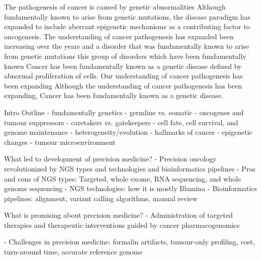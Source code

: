 The pathogenesis of cancer is caused by genetic abnormalities
Although fundamentally known to arise from genetic mutations, the disease paradigm has expanded to include aberrant epigenetic mechanisms as a contributing factor to oncogenesis.
The understanding of cancer pathogenesis has expanded been increasing over the years and a disorder that was fundamentally known to arise from genetic mutations this group of disorders which have been fundamentally known Cancer has been fundamentally known as a genetic disease defined by abnormal proliferation of cells.
Our understanding of cancer pathogenesis has been expanding  Although the understanding of cancer pathogenesis has been expanding, Cancer has been fundamentally known as a genetic disease.

Intro Outline
- fundamentally genetics
- germline vs. somatic
- oncogenes and tumour suppressors
- caretakers vs. gatekeepers
- cell fate, cell survival, and genome maintenance
- heterogeneity/evolution
- hallmarks of cancer
- epigenetic changes
- tumour microenvironment

What led to development of precision medicine?
- Precision oncology revolutionized by NGS types and technologies and bioinformatics pipelines
- Pros and cons of NGS types: Targeted, whole exome, RNA sequencing, and whole genome sequencing
- NGS technologies: how it is mostly Illumina
- Bioinformatics pipelines: alignment, variant calling algorithms, manual review

What is promising about precision medicine?
- Administration of targeted therapies and therapeutic interventions guided by cancer pharmacogenomics

- Challenges in precision medicine: formalin artifacts, tumour-only profiling, cost, turn-around time, accurate reference genome
